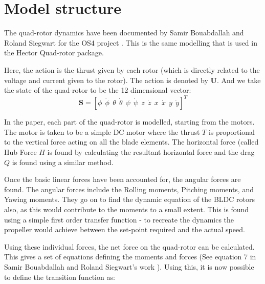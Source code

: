 \documentclass[hidelinks,BTech]{iitmdiss}
\begin{document}
\section{Model structure}

The quad-rotor dynamics have been documented by Samir Bouabdallah and Roland Siegwart for the OS4 project \cite{QuadrotorDynamics}. This is the same modelling that is used in the Hector Quad-rotor package.

Here, the action is the thrust given by each rotor (which is directly related to the voltage and current given to the rotor). The action is denoted by $\mathbf{U}$. And we take the state of the quad-rotor to be the 12 dimensional vector:
\begin{equation}
  \mathbf{S} = \left[\phi\ \ \dot{\phi}\ \ \theta\ \ \dot{\theta}\ \ \psi\ \ \dot{\psi}\ \ z\ \ \dot{z}\ \ x\ \ \dot{x}\ \ y\ \ \dot{y}\right]^{T}
\end{equation}

In the paper, each part of the quad-rotor is modelled, starting from the motors. The motor is taken to be a simple DC motor where the thrust $T$ is proportional to the vertical force acting on all the blade elements. The horizontal force (called Hub Force $H$ is found by calculating the resultant horizontal force and the drag $Q$ is found using a similar method.

Once the basic linear forces have been accounted for, the angular forces are found. The angular forces include the Rolling moments, Pitching moments, and Yawing moments. They go on to find the dynamic equation of the BLDC rotors also, as this would contribute to the moments to a small extent. This is found using a simple first order transfer function - to recreate the dynamics the propeller would achieve between the set-point required and the actual speed.

Using these individual forces, the net force on the quad-rotor can be calculated. This gives a set of equations defining the moments and forces (See equation 7 in Samir Bouabdallah and Roland Siegwart's work \cite{QuadrotorDynamics}). Using this, it is now possible to define the transition function as:
\end{document}
